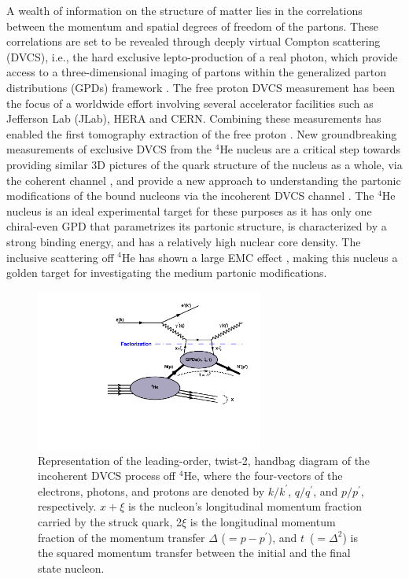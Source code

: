 \documentclass[twocolumn,nofootinbib,showpacs,prl,superscriptaddress,secnumarabic,amssymb,nobibnotes,aps,floatfix]{revtex4}
\begin{document}
A wealth of information on the structure of matter lies in the correlations 
between the momentum and spatial degrees of freedom of the partons. These 
correlations are set to be revealed through deeply virtual Compton scattering 
(DVCS), i.e., the hard exclusive lepto-production of a real photon, which 
provide access to a three-dimensional imaging of partons within the generalized 
parton distributions (GPDs) framework 
\cite{Mueller:1998fv,Ji:1996ek,Ji:1996nm,Radyushkin:1996nd,Radyushkin:1997ki}.   
The free proton DVCS measurement has been the focus of a worldwide effort 
\cite{Stepanyan:2001sm,Airapetian,Chekanov:2003ya,Aktas:2005ty,Chen:2006na,Munoz 
Camacho:2006hx,Girod:2007aa,Mazouz:2007aa,Gavalian:2009,Seder:2015,Pisano:2015,Jo:2015ema}
involving several accelerator facilities such as Jefferson Lab (JLab), HERA and  
CERN. Combining these measurements has enabled the first tomography extraction 
of the free proton \cite{Dupre:2016mai}. New groundbreaking measurements of 
exclusive DVCS from the $^{4}$He nucleus are a critical step towards providing 
similar 3D pictures of the quark structure of the nucleus as a whole, via the 
coherent channel \cite{Hattawy:2017woc}, and provide a new approach to 
understanding the partonic modifications of the bound nucleons via the 
incoherent DVCS channel \cite{simonetta_2,Guzey:2006xi,Guzey:2008fe}. The 
$^{4}$He nucleus is an ideal experimental target for these purposes as it has 
only one chiral-even GPD that parametrizes its partonic structure, is 
characterized by a strong binding energy, and has a relatively high nuclear 
core density. The inclusive scattering off $^{4}$He has shown a large EMC 
effect \cite{JSeely}, making this nucleus a golden target for investigating the 
medium partonic modifications. 


\begin{figure}[tb]
\includegraphics[width=7.5cm]{figs/handbag_incoherent.pdf}
\caption{Representation of the leading-order, twist-2, handbag diagram of the 
   incoherent DVCS process off $^4$He, where the four-vectors of the electrons, 
   photons, and protons are denoted by $k/k^\prime$, $q/q^\prime$, and 
   $p/p^\prime$, respectively. $x+\xi$ is the nucleon’s longitudinal momentum 
   fraction carried by the struck quark, 2$\xi$ is the longitudinal momentum 
   fraction of the momentum transfer $\Delta$ ($= p - p^\prime$), and 
   $t$~($=\Delta^2$) is the squared momentum transfer between the initial and
   the final state nucleon.}
\label{fig:diags}
\end{figure}
\end{document}
